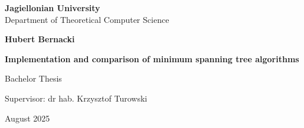 \begin{titlepage}
	\begin{center}
        
		\large
		\textbf{Jagiellonian University}\\
		Department of Theoretical Computer Science\\

		\vspace{1.5cm}

		\Large
		\textbf{Hubert Bernacki}

		\vspace*{2cm}

		\textbf{\LARGE Implementation and comparison of minimum spanning tree algorithms }
		
		\vspace{0.5cm}
		\large
		
		\vfill
		\Large
		Bachelor Thesis

		\vfill
		\Large
		Supervisor: dr hab. Krzysztof Turowski
		
		\vspace{0.8cm}
		
		  August 2025
		
\end{center}
\end{titlepage}